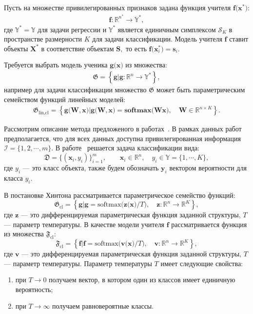 Пусть на множестве привилегированных признаков задана функция учителя $\mathbf{f}\bigr(\mathbf{x}^*\bigr)$:
\[
\label{eq:st:4}
\begin{aligned}
\mathbf{f}:\mathbb{R}^{n^*} \to \mathbb{Y}^*,
\end{aligned}
\]
где $\mathbb{Y}^*=\mathbb{Y}$ для задачи регрессии и $\mathbb{Y}^*$ является единичным симплексом $\mathcal{S}_K$ в пространстве размерности $K$ для задачи классификации. Модель учителя $\mathbf{f}$ ставит объекты $\mathbf{X}^*$ в соответствие объектам $\mathbf{S},$ то есть  $\mathbf{f}\bigr(\mathbf{x}^*_i\bigr)=\mathbf{s}_i$.

Требуется выбрать модель ученика $\mathbf{g}\bigr(\mathbf{x}\bigr)$ из множества:
\[
\label{eq:st:G}
\begin{aligned}
\mathfrak{G} = \left\{\mathbf{g}| \mathbf{g}:\mathbb{R}^{n} \to \mathbb{Y}^*\right\},
\end{aligned}
\]
например для задачи классификации множество $\mathfrak{G}$ может быть параметрическим семейством функций линейных моделей:
\[
\label{eq:st:G:lin:cl}
\begin{aligned}
\mathfrak{G}_\text{lin,cl} = \left\{\mathbf{g}\bigr(\mathbf{W}, \mathbf{x}\bigr)| \mathbf{g}\bigr(\mathbf{W}, \mathbf{x}\bigr) = \textbf{softmax}\bigr(\mathbf{W}\mathbf{x}\bigr), \quad \mathbf{W} \in \mathbb{R}^{n\times K}\right\}.
\end{aligned}
\]

Рассмотрим описание метода предложеного в работах~\cite{Hinton2015, Lopez2016}. В рамках данных работ предполагается, что для всех данных доступна привилегированная информация $\mathcal{I} = \{1, 2, \cdots, m\}$. В работе~\cite{Hinton2015} решается задача классификации вида:
\[
    \mathfrak{D} = \{\left(\mathbf{x}_i, y_i\right)\}_{i=1}^{m}, \qquad \mathbf{x}_i \in \mathbb{R}^{n}, \quad y_i \in \mathbb{Y}=\{1, \cdots, K\},
\]
где $y_i$ --- это класс объекта, также будем обозначать $\mathbf{y}_i$ вектором вероятности для класса $y_i$.

В постановке Хинтона рассматривается параметрическое семейство функций:
\[
\label{eq:G:set:cl}
\mathfrak{G}_{\text{cl}} = \left\{\mathbf{g}| \mathbf{g} = \text{softmax}\bigr(\mathbf{z}\bigr(\mathbf{x}\bigr)/T\bigr), \quad \mathbf{z}: \mathbb{R}^n \to \mathbb{R}^K \right\},
\]
где $\mathbf{z}$ --- это дифференцируемая параметрическая функция заданной структуры, $T$ --- параметр температуры. В качестве модели учителя $\mathbf{f}$ рассматривается функция из множества $\mathfrak{F}_{\text{cl}}$:
\[
\label{eq:F:set:cl}
\mathfrak{F}_{\text{cl}} = \left\{\mathbf{f}| \mathbf{f} = \text{softmax}\bigr(\mathbf{v}\bigr(\mathbf{x}\bigr)/T\bigr), \quad \mathbf{v}: \mathbb{R}^n \to \mathbb{R}^K \right\},
\]
где $\mathbf{v}$ --- это дифференцируемая параметрическая функция заданной структуры, $T$ --- параметр температуры.
Параметр температуры $T$ имеет следующие свойства:
\begin{enumerate}
    \item при $T\to 0$ получаем вектор, в котором один из классов имеет единичную вероятность;
    \item при $T\to \infty$ получаем равновероятные классы.
\end{enumerate}

